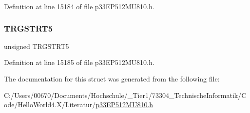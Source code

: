 Definition at line 15184 of file p33\+E\+P512\+M\+U810.\+h.

\mbox{\label{structtag_t_r_g_c_o_n5_b_i_t_s_aabeb06bb6258310e01e1a0cd96bf30ca}} 
\subsubsection{\texorpdfstring{T\+R\+G\+S\+T\+R\+T5}{TRGSTRT5}}
{\footnotesize\ttfamily unsigned T\+R\+G\+S\+T\+R\+T5}



Definition at line 15185 of file p33\+E\+P512\+M\+U810.\+h.



The documentation for this struct was generated from the following file\+:\begin{DoxyCompactItemize}
\item 
C\+:/\+Users/00670/\+Documents/\+Hochschule/\+\_\+\+Tier1/73304\+\_\+\+Technische\+Informatik/\+Code/\+Hello\+World4.\+X/\+Literatur/\hyperlink{p33_e_p512_m_u810_8h}{p33\+E\+P512\+M\+U810.\+h}\end{DoxyCompactItemize}
